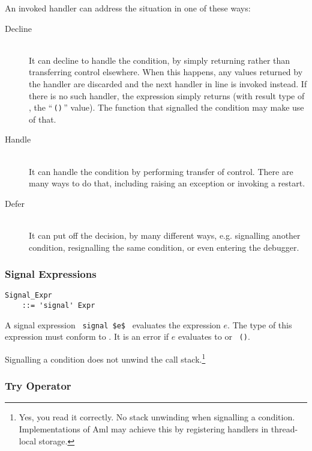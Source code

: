 An invoked handler can address the situation in one of these ways: 
\begin{description}
  \item[Decline] \hfill \\
    It can decline to handle the condition, by simply returning rather than transferring control elsewhere. When this happens, any values returned by the handler are discarded and the next handler in line is invoked instead. If there is no such handler, the  expression simply returns (with result type of , the ``\,\lstinline!()!\,'' value). The function that signalled the condition may make use of that. 
  \item[Handle] \hfill \\
    It can handle the condition by performing transfer of control. There are many ways to do that, including raising an exception or invoking a restart. 
  \item[Defer] \hfill \\
    It can put off the decision, by many different ways, e.g. signalling another condition, resignalling the same condition, or even entering the debugger. 
\end{description}





\subsubsection{Signal Expressions}
\label{sec:signal-expressions}

\grammar\begin{lstlisting}
Signal_Expr 
    ::= 'signal' Expr
\end{lstlisting}

A signal expression ~\lstinline!signal $e$!~ evaluates the expression $e$. The type of this expression must conform to . It is an error if $e$ evaluates to  or ~\lstinline!()!.

Signalling a condition does not unwind the call stack.\footnote{Yes, you read it correctly. No stack unwinding when signalling a condition. Implementations of Aml may achieve this by registering handlers in thread-local storage.}





\subsubsection{Try Operator}
\label{sec:try-operator}

